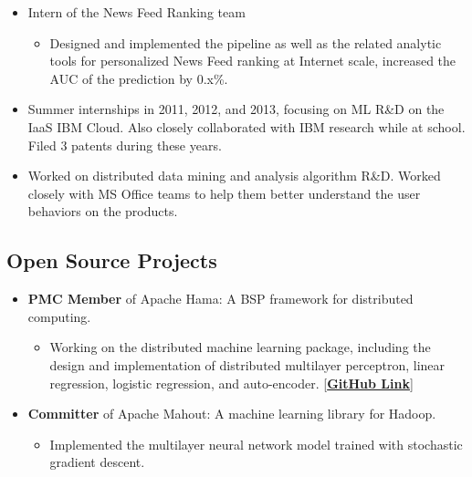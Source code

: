 \documentclass[11pt,a4paper,sans]{moderncv}
\begin{document}
{\begin{itemize}
\begin{itemize}
  \end{itemize}
\item Intern of the News Feed Ranking team
  \begin{itemize}\itemsep 0.1in
      \item Designed and implemented the pipeline as well as the related analytic tools for personalized News Feed ranking at Internet scale, increased the AUC of the prediction by 0.x\%. %
  \end{itemize}
\end{itemize}
}
{
\begin{itemize}%
\item Summer internships in 2011, 2012, and 2013, focusing on ML R\&D on the IaaS IBM Cloud. Also closely collaborated with IBM research while at school. Filed 3 patents during these years.	
\end{itemize}
} %
{
\begin{itemize} \itemsep 0.1in
    \item Worked on distributed data mining and analysis algorithm R\&D. Worked closely with MS Office teams to help them better understand the user behaviors on the products.
\end{itemize}
} %

\subsection{Open Source Projects}
{
\begin{itemize}
\item \textbf{PMC Member} of Apache Hama: A BSP framework for distributed computing.
  \begin{itemize} \itemsep 0.1in
    \item Working on the distributed machine learning package, including the design and implementation of distributed multilayer perceptron, linear regression, logistic regression, and auto-encoder. [\textbf{\href{https://github.com/yxjiang/hama}{GitHub Link}}]
  \end{itemize}
\item \textbf{Committer} of Apache Mahout: A machine learning library for Hadoop.
  \begin{itemize} \itemsep 0.1in
      \item Implemented the multilayer neural network model trained with  stochastic gradient descent.
  \end{itemize}
\end{itemize}
} %
\end{document}
